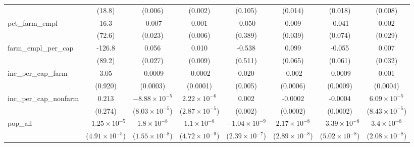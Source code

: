 \begin{table}[htbp]
\begin{tabular}{lccccccc}
                                & (18.8)                  & (0.006)                 & (0.002)                 & (0.105)                 & (0.014)                 & (0.018)                 & (0.008)\\   
      pct\_farm\_empl           & 16.3                    & -0.007                  & 0.001                   & -0.050                  & 0.009                   & -0.041                  & 0.002\\   
                                & (72.6)                  & (0.023)                 & (0.006)                 & (0.389)                 & (0.039)                 & (0.074)                 & (0.029)\\   
      farm\_empl\_per\_cap      & -126.8                  & 0.056                   & 0.010                   & -0.538                  & 0.099                   & -0.055                  & 0.007\\   
                                & (89.2)                  & (0.027)                 & (0.009)                 & (0.511)                 & (0.065)                 & (0.061)                 & (0.032)\\   
      inc\_per\_cap\_farm       & 3.05                    & -0.0009                 & -0.0002                 & 0.020                   & -0.002                  & -0.0009                 & 0.001\\   
                                & (0.920)                 & (0.0003)                & (0.0001)                & (0.005)                 & (0.0006)                & (0.0009)                & (0.0004)\\   
      inc\_per\_cap\_nonfarm    & 0.213                   & $-8.88\times 10^{-5}$   & $2.22\times 10^{-6}$    & 0.002                   & -0.0002                 & -0.0004                 & $6.09\times 10^{-5}$\\    
                                & (0.274)                 & ($8.03\times 10^{-5}$)  & ($2.87\times 10^{-5}$)  & (0.002)                 & (0.0002)                & (0.0002)                & ($8.43\times 10^{-5}$)\\    
      pop\_all                  & $-1.25\times 10^{-5}$   & $1.8\times 10^{-8}$     & $1.1\times 10^{-8}$     & $-1.04\times 10^{-9}$   & $2.17\times 10^{-8}$    & $-3.39\times 10^{-8}$   & $3.4\times 10^{-8}$\\    
                                & ($4.91\times 10^{-5}$)  & ($1.55\times 10^{-8}$)  & ($4.72\times 10^{-9}$)  & ($2.39\times 10^{-7}$)  & ($2.89\times 10^{-8}$)  & ($5.02\times 10^{-8}$)  & ($2.08\times 10^{-8}$)\\    

\end{tabular}
\end{table}
